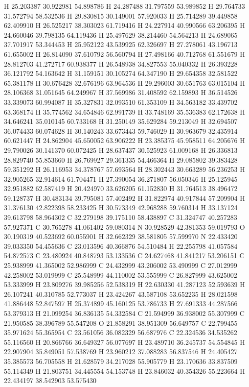 \documentclass{article}
\begin{document}
H 25.203387 30.922981 54.898786 
H 24.287488 31.797559 53.989852 
H 29.764733 31.572794 58.532536 
H 29.830815 30.149001 57.920033 
H 25.714289 39.449858 62.409910 
H 26.525217 38.303023 61.719416 
H 24.227914 40.990566 63.206395 
H 24.660046 39.798135 64.119436 
H 25.497629 38.214460 54.564213 
H 24.689065 37.701917 53.344453 
H 25.952122 43.539925 62.326697 
H 27.278061 43.196713 61.655002 
H 26.814090 37.610792 56.560794 
H 27.498166 40.712768 61.551679 
H 28.812703 41.272717 60.938377 
H 26.548938 34.827553 55.040332 
H 26.393228 36.121792 54.163642 
H 31.159151 30.105274 64.347190 
H 29.654358 32.581522 65.381178 
H 30.676428 32.676196 63.964536 
H 29.296003 30.651763 63.015104 
H 28.106368 31.051645 64.249967 
H 37.569986 31.408592 62.159893 
H 36.514526 33.339073 60.994087 
H 35.327831 32.093510 61.353109 
H 34.563182 33.439702 63.368174 
H 35.774562 34.654846 62.991739 
H 33.748169 35.536383 62.172638 
H 34.646241 35.010145 60.733168 
H 31.250149 35.629284 59.213049 
H 32.694507 36.074433 60.074628 
H 30.140243 33.673443 59.746029 
H 30.963679 32.435914 60.621447 
H 24.862904 45.650052 63.906222 
H 23.385375 45.958511 64.205676 
H 29.790026 30.141370 60.072425 
H 28.637437 30.525923 61.009168 
H 26.336813 28.829740 55.853660 
H 26.769927 29.361335 54.466364 
H 29.085802 39.383428 59.351292 
H 26.116953 34.378767 57.693564 
H 28.302443 30.663289 56.236253 
H 32.905265 32.914614 61.704471 
H 27.390054 36.271807 56.050346 
H 25.125945 32.951882 62.587419 
H 20.424970 33.626205 61.152830 
H 31.764513 38.496472 59.128737 
H 30.483134 39.795081 57.402492 
H 31.822974 40.917844 57.209904 
H 31.376130 42.822398 58.233425 
H 30.573349 42.968288 59.760314 
H 33.137124 39.613798 58.964302 
C 32.279198 39.175110 58.438897 
C 31.324747 40.257283 57.927371 
C 30.765278 41.061402 59.080314 
N 30.928529 42.381353 59.019793 
O 30.190319 40.523692 60.055901 
H 32.662329 38.581805 57.599970 
N 22.433420 39.033350 54.455636 
C 23.013596 40.366876 54.510484 
H 22.255798 41.057584 54.872573 
C 23.480924 40.848793 53.133536 
C 24.627468 41.841217 53.206151 
C 25.938999 41.365002 52.986999 
C 24.432999 43.206002 53.490999 
C 27.012999 42.258002 53.019999 
C 25.548999 44.110002 53.555999 
C 26.827999 43.625002 53.333999 
H 23.809276 39.985256 52.538319 
H 22.630330 41.287123 52.593639 
H 26.107241 40.310785 52.773037 
H 23.424267 43.587108 53.652235 
H 28.021598 41.886448 52.847597 
H 25.374899 45.160125 53.786733 
H 27.691333 44.287566 53.379313 
H 21.099254 36.836135 54.332584 
C 21.594999 36.938002 55.307999 
C 21.950585 38.396789 55.547208 
O 21.858291 38.951309 56.649757 
C 22.799455 35.971624 55.365954 
C 23.561056 36.082329 56.687976 
C 22.324536 34.535262 55.116560 
H 20.866766 36.649327 56.077697 
H 23.489710 36.245737 54.554845 
H 22.907904 35.849051 57.538769 
H 23.960212 37.088283 56.837546 
H 24.405427 35.385573 56.705558 
H 21.628579 34.217028 55.905779 
H 23.170636 33.837509 55.114349 
H 21.803751 34.445554 54.153748 
H 23.846032 40.354326 55.223664 
H 22.434197 38.542903 53.575430 
~     
    
\end{document}

